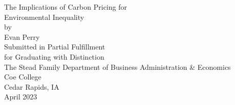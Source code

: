 \documentclass[letterpaper, 11pt]{article}
\newcommand{\1}{\mathds{1}}
\begin{document}

\begin{titlepage}
	\centering
	{\fontsize{14}{14}\selectfont The Implications of Carbon Pricing for\\ Environmental
	Inequality}\\
	\vspace{14em}
	by\\
	Evan Perry\\
	\vspace{10em}
	Submitted in Partial Fulfillment\\
	for Graduating with Distinction\\
	\vspace{6em}
	The Stead Family Department of Business Administration \& Economics\\
	\vspace{9em}
	Coe College\\
	Cedar Rapids, IA\\
	April 2023
\end{titlepage}

\doublespacing


\newpage
\thispagestyle{empty}
~
\setcounter{page}{0}
\newpage
\tableofcontents









\newpage





\end{document}
